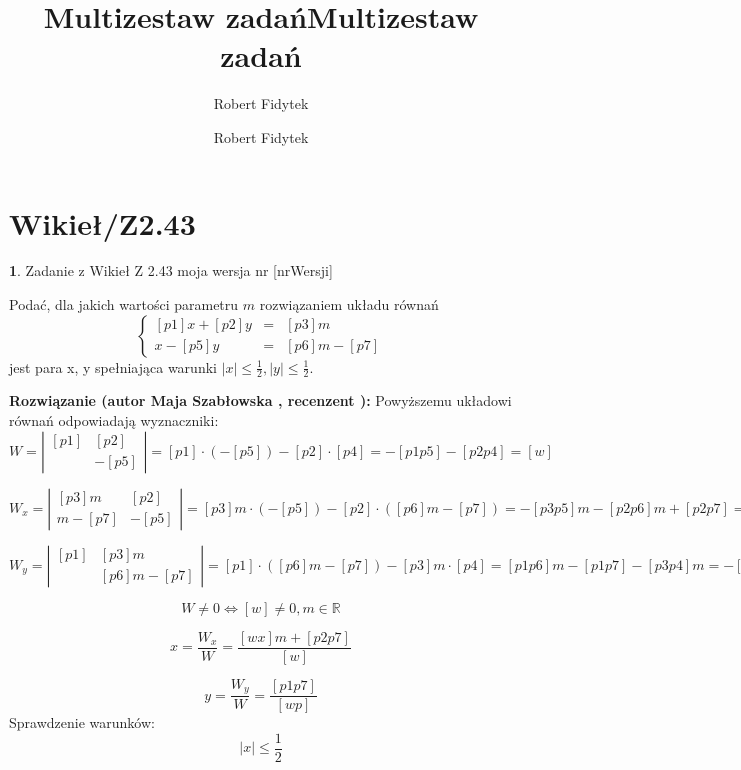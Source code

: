 \documentclass[12pt, a4paper]{article}
\title{Multizestaw zadań}
\author{Robert Fidytek}
\date{}\documentclass[12pt, a4paper]{article}
\title{Multizestaw zadań}
\author{Robert Fidytek}
\date{}
\theoremstyle{definition} %
\newtheorem{zad}{}
\theoremstyle{definition} %
\newtheorem{zad}{}
\newcommand{\kategoria}[1]{\section{#1}} %
\newcommand{\zadStart}[1]{\begin{zad}#1\newline} %
\newcommand{\zadStop}{\end{zad}}   %
\newcommand{\rozwStart}[2]{\noindent \textbf{Rozwiązanie (autor #1 , recenzent #2): }\newline} %
\begin{document}
\maketitle


\kategoria{Wikieł/Z2.43}
\zadStart{Zadanie z Wikieł Z 2.43  moja wersja nr [nrWersji]}

Podać, dla jakich wartości parametru $m$ rozwiązaniem układu równań
$$\left\{\begin{array}{ccc}
[p1]x+[p2]y&=&[p3]m\\
[p4]x-[p5]y&=&[p6]m-[p7]
\end{array} \right.$$
jest para x, y spełniająca warunki $|x|\leq\frac{1}{2}, |y|\leq\frac{1}{2}.$
\zadStop

\rozwStart{Maja Szabłowska}{}
Powyższemu układowi równań odpowiadają wyznaczniki:
$$W=\left| \begin{array}{lccr} [p1] & [p2] \\ [p4] & -[p5] \end{array}\right| = [p1]\cdot(-[p5]) - [p2]\cdot[p4]=-[p1p5]-[p2p4]=[w]$$

$$W_{x}=\left| \begin{array}{lccr} [p3]m & [p2] \\ [p6]m-[p7] & -[p5] \end{array}\right| = [p3]m\cdot(-[p5]) - [p2]\cdot([p6]m-[p7])=-[p3p5]m-[p2p6]m+[p2p7]=[wx]m+[p2p7]$$

$$W_{y}=\left| \begin{array}{lccr} [p1] & [p3]m \\ [p4] & [p6]m-[p7] \end{array}\right| = [p1]\cdot([p6]m-[p7]) - [p3]m\cdot[p4]=[p1p6]m-[p1p7]-[p3p4]m=-[p1p7]$$

$$W\neq 0 \iff [w] \neq 0, m\in\mathbb{R} $$

$$x=\frac{W_{x}}{W}=\frac{[wx]m+[p2p7]}{[w]}$$

$$y=\frac{W_{y}}{W}=\frac{[p1p7]}{[wp]}$$
Sprawdzenie warunków:
$$|x|\leq\frac{1}{2}$$
\end{document}
